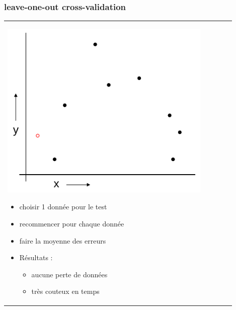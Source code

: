 \documentclass[handout]{beamer}
\begin{document}
		\begin{frame}
		\frametitle{leave-one-out cross-validation}
		\begin{tabular}{l l}
			\begin{minipage}{0.5\textwidth}
				\begin{center}
					\includegraphics[width=0.9\textwidth]{images/leave-one-out.png}
				\end{center}
			\end{minipage}

			\begin{minipage}{0.5\textwidth}
				\begin{itemize}
					\item choisir 1 donnée pour le test
					\item recommencer pour chaque donnée
					\item faire la moyenne des erreurs
					\item Résultats :
					\begin{itemize}
						\item aucune perte de données
						\item très couteux en temps
					\end{itemize}
				\end{itemize}
			\end{minipage}

		\end{tabular}
		\end{frame}
\end{document}
